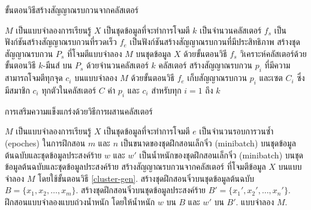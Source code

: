 \documentclass{cpereport}
\begin{document}
\begin{algorithm} 
    \caption{ขั้นตอนวิธีสร้างสัญญาณรบกวนจากคลัสเตอร์}
    \label{cluster-gen}
    \begin{algorithmic}
        \REQUIRE $M$ เป็นแบบจำลองการเรียนรู้
        \REQUIRE $X$ เป็นชุดข้อมูลที่จะทำการโจมตี
        \REQUIRE $k$ เป็นจำนวนคลัสเตอร์
        \REQUIRE $f_s$ เป็นฟังก์ชันสร้างสัญญาณรบกวนที่รวดเร็ว
        \REQUIRE $f_e$ เป็นฟังก์ชันสร้างสัญญาณรบกวนที่มีประสิทธิภาพ
        \STATE สร้างชุดสัญญาณรบกวน $P_s$ ที่โจมตีแบบจำลอง $M$ บนชุดข้อมูล $X$ ด้วยขั้นตอนวิธี $f_s$
        \STATE วิเคราะห์คลัสเตอร์ด้วยขั้นตอนวิธี $k$-มีนส์ บน $P_s$ ด้วยจำนวนคลัสเตอร์ $k$ คลัสเตอร์
            \STATE สร้างสัญญาณรบกวน $p_i$ ที่มีความสามารถโจมตีทุกจุด $c_i$ บนแบบจำลอง $M$ ด้วยขั้นตอนวิธี $f_e$
            \STATE เก็บสัญญาณรบกวน $p_i$ และเซต $C_i$ ซึ่งมีสมาชิก $c_i$ ทุกตัวในคลัสเตอร์ $C$
        \ENDFOR
        \RETURN ค่า $p_i$ และ $c_i$ สำหรับทุก $i = 1$ ถึง $k$
    \end{algorithmic}
\end{algorithm}

\begin{algorithm} 
    \caption{การเสริมความแข็งแกร่งด้วยวิธีการผสานคลัสเตอร์}
    \label{cluster-retrain}
    \begin{algorithmic}
        \REQUIRE $M$ เป็นแบบจำลองการเรียนรู้
        \REQUIRE $X$ เป็นชุดข้อมูลที่จะทำการโจมตี
        \REQUIRE $e$ เป็นจำนวนรอบการวนซ้ำ (epoches) ในการฝึกสอน
        \REQUIRE $m$ และ $n$ เป็นขนาดของชุดฝึกสอนเล็กจิ๋ว (minibatch) บนชุดข้อมูลต้นฉบับและชุดข้อมูลประสงค์ร้าย
        \REQUIRE $w$ และ $w'$ เป็นน้ำหนักของชุดฝึกสอนเล็กจิ๋ว (minibatch) บนชุดข้อมูลต้นฉบับและชุดข้อมูลประสงค์ร้าย
        \STATE สร้างสัญญาณรบกวนจากคลัสเตอร์ ที่โจมตีข้อมูล $X$ บนแบบจำลอง $M$ โดยใช้ขั้นตอนวิธี \ref{cluster-gen}.
            \STATE สร้างชุดฝึกสอนจิ๋วบนชุดข้อมูลต้นฉบับ $B=\{x_1, x_2, \dots, x_m\}$.
            \STATE สร้างชุดฝึกสอนจิ๋วบนชุดข้อมูลประสงค์ร้าย $B'=\{x_1', x_2', \dots, x_n'\}$.
            \STATE ฝึกสอนแบบจำลองแบบถ่วงน้ำหนัก โดยให้น้ำหนัก $w$ บน $B$ และ $w'$ บน $B'$.
        \ENDFOR
        \RETURN แบบจำลอง $M$.
    \end{algorithmic}
\end{algorithm}

 

\end{document}
